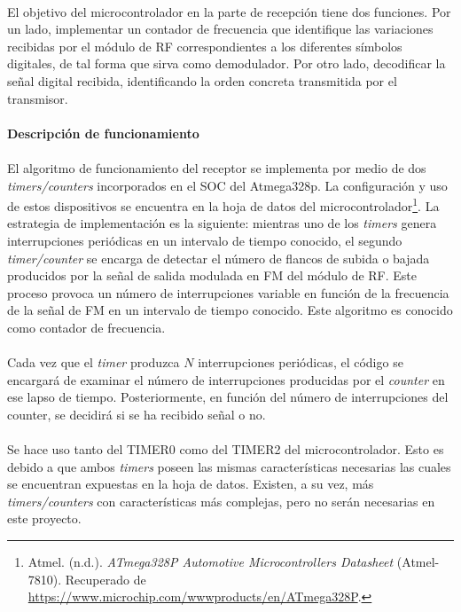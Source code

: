 \paragraph{} El objetivo del microcontrolador en la parte de recepción tiene dos funciones. Por un lado, implementar un contador de frecuencia que identifique las variaciones recibidas por el m\'odulo de RF correspondientes a los diferentes s\'imbolos digitales, de tal forma que sirva como demodulador. Por otro lado, decodificar la señal digital recibida, identificando la orden concreta transmitida por el transmisor.

\paragraph{Descripci\'on de funcionamiento} 
\paragraph{}
El algoritmo de funcionamiento del receptor se implementa por medio de dos \textit{timers/counters} incorporados en el SOC del Atmega328p. La configuraci\'on y uso de estos dispositivos se encuentra en la hoja de datos del microcontrolador\footnote{Atmel. (n.d.). \textit{ATmega328P Automotive Microcontrollers Datasheet} (Atmel-7810). Recuperado de \url{https://www.microchip.com/wwwproducts/en/ATmega328P}.}. La estrategia de implementación es la siguiente: mientras uno de los \textit{timers} genera interrupciones periódicas en un intervalo de tiempo conocido, el segundo \textit{timer/counter} se encarga de detectar el número de flancos de subida o bajada producidos por la señal de salida modulada en FM del módulo de RF. Este proceso provoca un número de interrupciones variable en función de la frecuencia de la señal de FM en un intervalo de tiempo conocido. Este algoritmo es conocido como contador de frecuencia.

\paragraph{} Cada vez que el \textit{timer} produzca $N$ interrupciones periódicas, el c\'odigo se encargará de examinar el número de interrupciones producidas por el \textit{counter} en ese lapso de tiempo. Posteriormente, en función del número de interrupciones del counter, se decidir\'a si se ha recibido señal o no.

\paragraph{} Se hace uso tanto del TIMER0 como del TIMER2 del microcontrolador. Esto es debido a que ambos \textit{timers} poseen las mismas caracter\'isticas necesarias las cuales se encuentran expuestas en la hoja de datos. Existen, a su vez, más \textit{timers/counters} con características más complejas, pero no serán necesarias en este proyecto.
